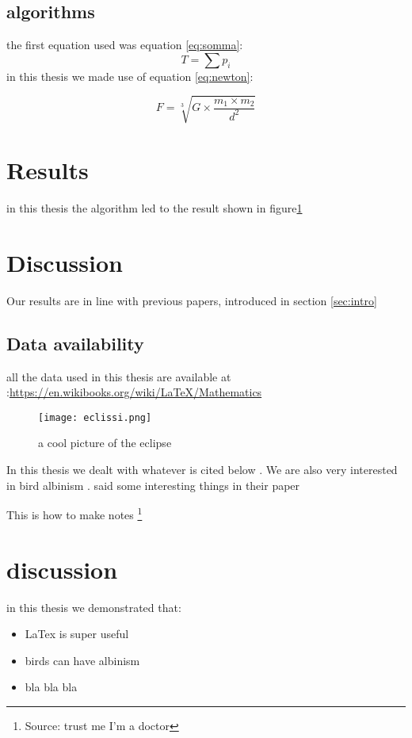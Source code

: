 \documentclass[12pt]{article}
\begin{document}
\subsection{algorithms}
the first equation used was equation \ref{eq:somma}:
\begin{equation}
    T=\sum p_i
    \label{eq:somma}
\end{equation}
\noindent in this thesis we made use of equation \ref{eq:newton}:

\begin{equation}
    F = \sqrt[3]{G \times \frac{m_1 \times m_2}{d^2}}
    \label{eq:newton}
\end{equation}


\section{Results}
in this thesis the algorithm led to the result shown in figure\ref{fig:eclipse}
\section{Discussion}
Our results are in line with previous papers, introduced in section \ref{sec:intro}

\subsection{Data availability}
all the data used in this thesis are available at :\url{https://en.wikibooks.org/wiki/LaTeX/Mathematics} %

\newpage

\begin{figure}
    \centering %
    \texttt{[image: eclissi.png]} 
    \caption{a cool picture of the eclipse}
    \label{fig:eclipse}
\end{figure}

In this thesis we dealt with whatever is cited below \cite{NClisby2005}. We are also very interested in bird albinism \cite{Bensch2000}.
\citet{Bensch2000} said some interesting things in their paper %

This is how to make notes
\footnote{Source: trust me I'm a doctor}

\section{discussion}
in this thesis we demonstrated that:
\begin{itemize}
    \item LaTex is super useful
    \item birds can have albinism
    \item bla bla bla
\end{itemize}
\end{document}

